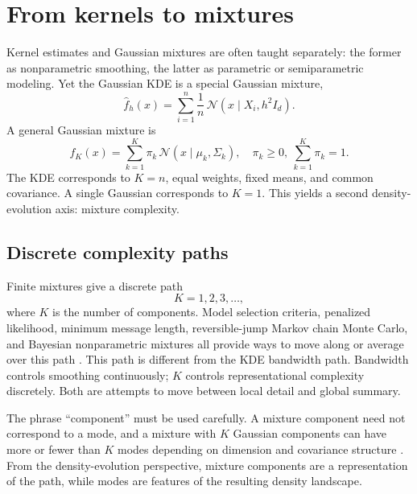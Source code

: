 \documentclass[preprint]{imsart}
\theoremstyle{plain}
\theoremstyle{definition}
\newcommand{\Normal}{\mathcal{N}}
\newcommand{\fhat}{\widehat f}
\begin{document}
\section{From kernels to mixtures}
\label{sec:mixtures}

Kernel estimates and Gaussian mixtures are often taught separately: the former as nonparametric smoothing, the latter as parametric or semiparametric modeling. Yet the Gaussian KDE is a special Gaussian mixture,
\begin{equation*}
  \fhat_h(x)=\sum_{i=1}^n \frac1n\,\Normal(x\mid X_i,h^2I_d).
\end{equation*}
A general Gaussian mixture is
\begin{equation*}
  f_K(x)=\sum_{k=1}^K \pi_k\,\Normal(x\mid \mu_k,\Sigma_k),
  \quad
  \pi_k\ge0,~ \sum_{k=1}^K\pi_k=1.
\end{equation*}
The KDE corresponds to $K=n$, equal weights, fixed means, and common covariance. A single Gaussian corresponds to $K=1$. This yields a second density-evolution axis: mixture complexity.

\subsection{Discrete complexity paths}
\label{subsec:mixture-paths}

Finite mixtures give a discrete path
\[
  K=1,2,3,\ldots,
\]
where $K$ is the number of components. Model selection criteria, penalized likelihood, minimum message length, reversible-jump Markov chain Monte Carlo, and Bayesian nonparametric mixtures all provide ways to move along or average over this path \citep{lindsay_1995_MixtureModelsTheory, richardson_1997_BayesianAnalysisMixtures, figueiredo_2002_UnsupervisedLearningFinite, fraley_2002_ModelBasedClusteringDiscriminant, mclachlan_2019_FiniteMixtureModels}. This path is different from the KDE bandwidth path. Bandwidth controls smoothing continuously; $K$ controls representational complexity discretely. Both are attempts to move between local detail and global summary.

The phrase ``component'' must be used carefully. A mixture component need not correspond to a mode, and a mixture with $K$ Gaussian components can have more or fewer than $K$ modes depending on dimension and covariance structure \citep{carreira-perpinan_2003_NumberModesGaussian, ray_2005_TopographyMultivariateNormal}. From the density-evolution perspective, mixture components are a representation of the path, while modes are features of the resulting density landscape.
\end{document}
